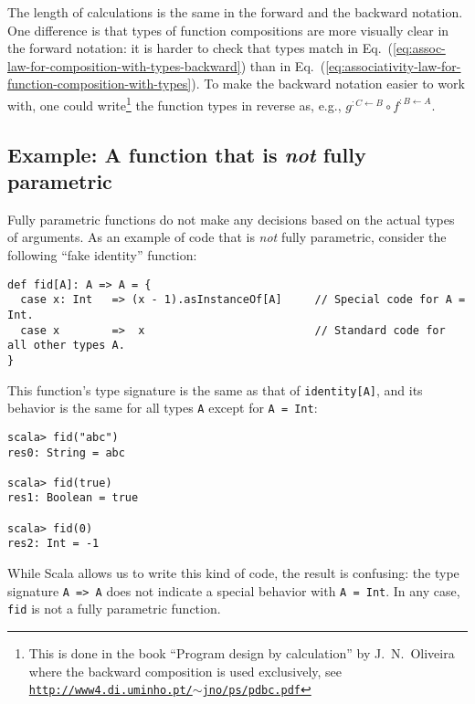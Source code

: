 The length of calculations is the same in the forward and the backward
notation. One difference is that types of function compositions are
more visually clear in the forward notation: it is harder to check
that types match in Eq.~(\ref{eq:assoc-law-for-composition-with-types-backward})
than in Eq.~(\ref{eq:associativity-law-for-function-composition-with-types}).
To make the backward notation easier to work with, one could write\footnote{This is done in the book \textsf{``}Program design by calculation\textsf{''} by J.~N.~Oliveira
where the backward composition is used exclusively, see \texttt{\href{http://www4.di.uminho.pt/~jno/ps/pdbc.pdf}{http://www4.di.uminho.pt/$\sim$jno/ps/pdbc.pdf}}} the function types in reverse as, e.g., $g^{:C\leftarrow B}\circ f^{:B\leftarrow A}$.

\subsection{Example: A function that is \emph{not} fully parametric}

Fully parametric functions do not make any decisions based on the
actual types of arguments. As an example of code that is \emph{not}
fully parametric, consider the following \textsf{``}fake identity\textsf{''} function:
\begin{lstlisting}
def fid[A]: A => A = {
  case x: Int   => (x - 1).asInstanceOf[A]     // Special code for A = Int.
  case x        =>  x                          // Standard code for all other types A.
}
\end{lstlisting}
This function\textsf{'}s type signature is the same as that of \lstinline!identity[A]!,
and its behavior is the same for all types \lstinline!A! except for
\lstinline!A = Int!:
\begin{lstlisting}
scala> fid("abc")
res0: String = abc

scala> fid(true)
res1: Boolean = true

scala> fid(0)
res2: Int = -1
\end{lstlisting}
While Scala allows us to write this kind of code, the result is confusing:
the type signature \lstinline!A => A! does not indicate a special
behavior with \lstinline!A = Int!. In any case, \lstinline!fid!
is not a fully parametric function.

